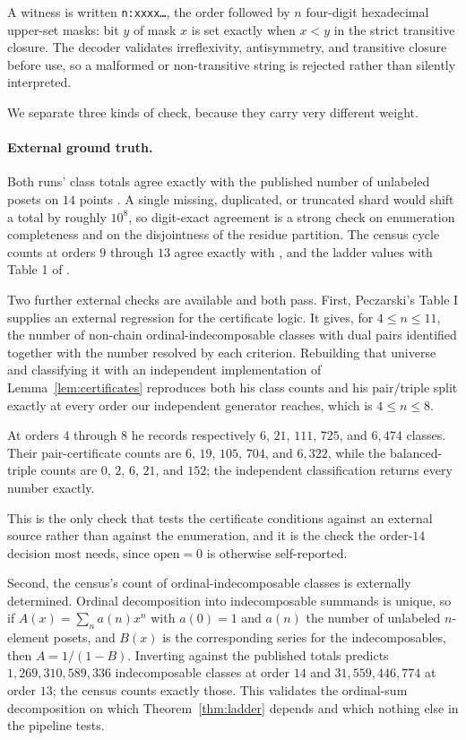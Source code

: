 \documentclass[11pt]{article}
\theoremstyle{definition}
\begin{document}
A witness is written \texttt{n:xxxx\ldots}, the order followed by $n$
four-digit hexadecimal upper-set masks: bit $y$ of mask $x$ is set exactly
when $x<y$ in the strict transitive closure.  The decoder validates
irreflexivity, antisymmetry, and transitive closure before use, so a malformed
or non-transitive string is rejected rather than silently interpreted.

We separate three kinds of check, because they carry very different weight.

\paragraph{External ground truth.}
Both runs' class totals agree exactly with the published number of unlabeled
posets on $14$ points \cite{heitzig-reinhold,brinkmann-mckay}.  A single
missing, duplicated, or truncated shard would shift a total by roughly
$10^{8}$, so digit-exact agreement is a strong check on enumeration
completeness and on the disjointness of the residue partition.  The census
cycle counts at orders $9$ through $13$ agree exactly with
\cite{deloof-census}, and the ladder values with Table 1 of
\cite{peczarski-ladders}.

Two further external checks are available and both pass.  First, Peczarski's
Table I \cite{peczarski-gold} supplies an external regression for the
certificate logic.  It gives, for $4\leq n\leq11$, the number of non-chain
ordinal-indecomposable
classes with dual pairs identified together with the number resolved by each
criterion.  Rebuilding that universe and classifying it with an independent
implementation of Lemma~\ref{lem:certificates} reproduces both his class
counts and his pair/triple split exactly at every order our independent
generator reaches, which is $4\leq n\leq8$.

At orders $4$ through $8$ he records respectively $6$, $21$, $111$, $725$,
and $6{,}474$ classes.  Their pair-certificate counts are $6$, $19$, $105$,
$704$, and $6{,}322$, while the balanced-triple counts are $0$, $2$, $6$,
$21$, and $152$; the independent classification returns every number exactly.

This is the only check that tests the certificate conditions against an
external source rather than against the enumeration, and it is the check the
order-$14$ decision most needs, since $\mathrm{open}=0$ is otherwise
self-reported.

Second, the census's count of ordinal-indecomposable classes is externally
determined.  Ordinal decomposition into indecomposable summands is unique, so
if $A(x)=\sum_n a(n)x^n$ with $a(0)=1$ and $a(n)$ the number of unlabeled
$n$-element posets, and $B(x)$ is the corresponding series for the
indecomposables, then $A=1/(1-B)$.  Inverting against the published totals
\cite{heitzig-reinhold,brinkmann-mckay} predicts $1{,}269{,}310{,}589{,}336$
indecomposable classes at order $14$ and $31{,}559{,}446{,}774$ at order $13$;
the census counts exactly those.  This validates the ordinal-sum decomposition
on which Theorem~\ref{thm:ladder} depends and which nothing else in the
pipeline tests.
\end{document}

